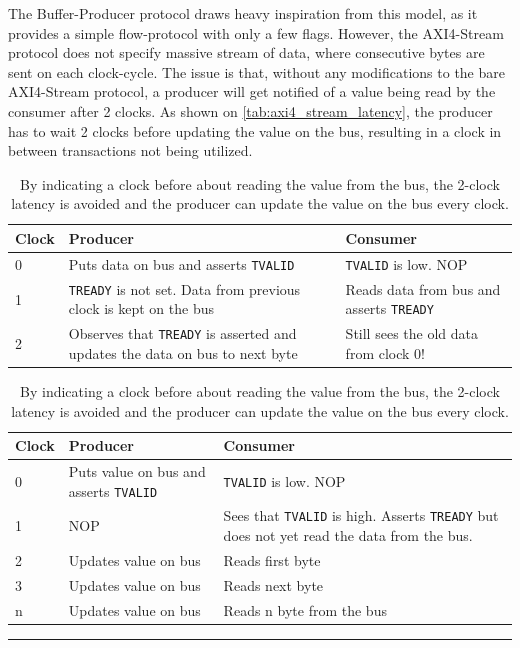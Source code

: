The Buffer-Producer protocol draws heavy inspiration from this model, as it
provides a simple flow-protocol with only a few flags. However, the AXI4-Stream
protocol does not specify massive stream of data, where consecutive bytes are
sent on each clock-cycle. The issue is that, without any modifications to the
bare AXI4-Stream protocol, a producer will get notified of a value being read
by the consumer after 2 clocks. As shown on
\autoref{tab:axi4_stream_latency}, the producer has to wait 2 clocks before
updating the value on the bus, resulting in a clock in between transactions not
being utilized.


\begin{table}[h]
  \begin{minipage}[b]{\dimexpr.5\textwidth-.5\columnsep}
    \centering
\begin{tabular}{p{1cm} | p{2.4cm} | p{2.4cm}}
\toprule
		\textbf{Clock} & \textbf{Producer} & \textbf{Consumer} \\
\midrule
		0 & Puts data on bus and asserts \texttt{TVALID} &
		\texttt{TVALID} is low. NOP \\ \hline
		1 & \texttt{TREADY} is not set. Data from previous clock is
		kept on the bus & Reads data from bus and asserts \texttt{TREADY}\\ \hline
		2 & Observes that \texttt{TREADY} is asserted and updates the
		data on bus to next byte & \cellcolor{red!25} Still sees the
		old data from clock $0$!\\
\bottomrule
\end{tabular}
\caption{With the 2-clock latency for the \texttt{TVALID}/\texttt{TREADY}
	signal to propagate, the AXI4-Stream protocol cannot send consecutive
	bytes every clock.}
\label{tab:axi4_stream_latency}
\end{minipage}\hfill%
\begin{minipage}[b]{\dimexpr.5\textwidth-.5\columnsep}
\begin{tabular}{p{1cm} | p{2.4cm} | p{2.4cm}}
\toprule
		\textbf{Clock} & \textbf{Producer} & \textbf{Consumer} \\
\midrule
		0 & Puts value on bus and asserts \texttt{TVALID} &
		\texttt{TVALID} is low. NOP \\ \hline
		1 & NOP & Sees that \texttt{TVALID} is high. Asserts
		\texttt{TREADY} but does not yet read the data from the bus.\\ \hline
		2 & Updates value on bus & Reads first byte \\ \hline
		3 & Updates value on bus & \cellcolor{green!25} Reads next byte \\ \hline
		n & Updates value on bus & \cellcolor{green!25} Reads n byte from the bus \\
\bottomrule
\end{tabular}
	\caption{By indicating a clock before about reading the value from the
	  bus, the 2-clock latency is avoided and the producer can update the
	  value on the bus every clock.}
\label{tab:bp_stream_latency}
\end{minipage}
\hrule
\end{table}

